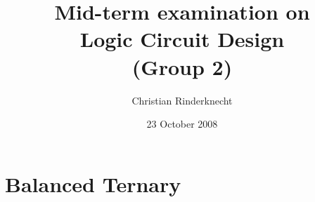 \documentclass[11pt,a4paper]{article}
\title{Mid-term examination on\\ Logic Circuit Design\\ (Group 2)}
\author{Christian Rinderknecht}
\date{23 October 2008}
\begin{document}
\maketitle
\thispagestyle{empty}

\allowdisplaybreaks

\section{Balanced Ternary}





\end{document}
